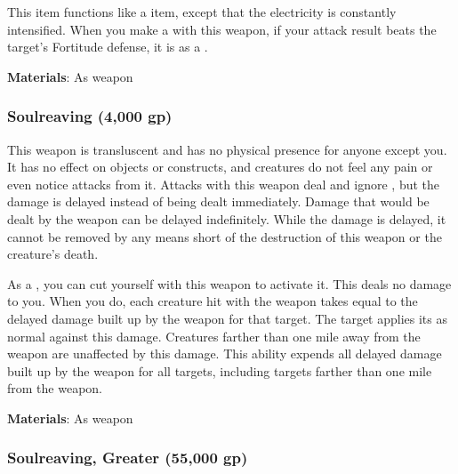 This item functions like a  item, except that the electricity is constantly intensified.
When you make a  with this weapon, if your attack result beats the target's Fortitude defense, it is \dazed as a .



\vspace{0.25em}
\textbf{Materials}: As weapon


\lowercase{\hypertarget{item:Soulreaving}{}}\label{item:Soulreaving}
\hypertarget{item:Soulreaving}{\subsubsection{Soulreaving\hfill{} (4,000 gp)}}

This weapon is transluscent and has no physical presence for anyone except you.
It has no effect on objects or constructs, and creatures do not feel any pain or even notice attacks from it.
Attacks with this weapon deal  and ignore , but the damage is delayed instead of being dealt immediately.
Damage that would be dealt by the weapon can be delayed indefinitely.
While the damage is delayed, it cannot be removed by any means short of the destruction of this weapon or the creature's death.

As a , you can cut yourself with this weapon to activate it.
This deals no damage to you.
When you do, each creature hit with the weapon takes  equal to the delayed damage built up by the weapon for that target.
The target applies its  as normal against this damage.
Creatures farther than one mile away from the weapon are unaffected by this damage.
This ability expends all delayed damage built up by the weapon for all targets, including targets farther than one mile from the weapon.



\vspace{0.25em}
\textbf{Materials}: As weapon


\lowercase{\hypertarget{item:Soulreaving, Greater}{}}\label{item:Soulreaving, Greater}
\hypertarget{item:Soulreaving, Greater}{\subsubsection{Soulreaving, Greater\hfill{} (55,000 gp)}}

